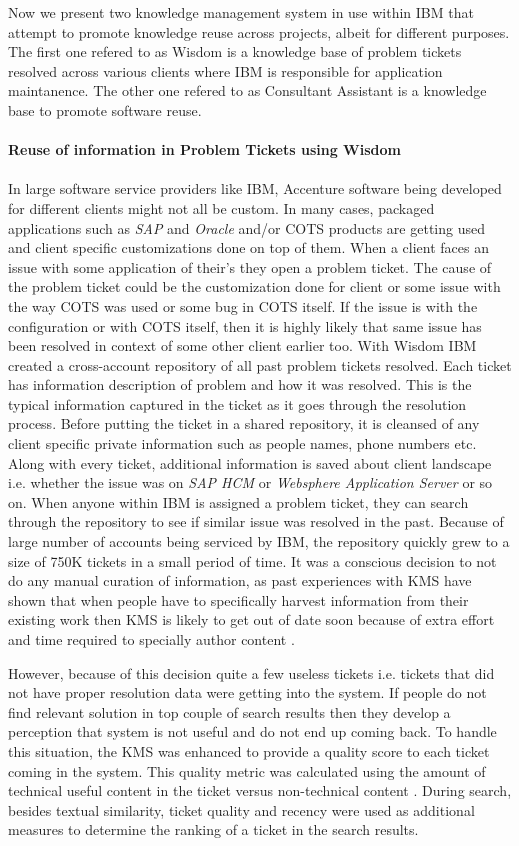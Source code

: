 Now we present two knowledge management system in use within IBM that attempt to promote knowledge reuse across projects, albeit for different purposes. The first one refered to as Wisdom\cite{} is a knowledge base of problem tickets resolved across various clients where IBM is responsible for application maintanence. The other one refered to as Consultant Assistant\cite{} is a knowledge base to promote software reuse. \\
\\
{\bf Reuse of information in Problem Tickets using Wisdom}\\ 
\\
In large software service providers like IBM, Accenture software being developed for different clients might not all be custom. In many cases, packaged applications such as \textit{SAP} and \textit{Oracle} and/or COTS products are getting used and client specific customizations done on top of them. When a client faces an issue with some application of their's they open a problem ticket. The cause of the problem ticket could be the customization done for client or some issue with the way COTS was used or some bug in COTS itself. If the issue is with the configuration or with COTS itself, then it is highly likely that same issue has been resolved in context of some other client earlier too. With Wisdom IBM created a cross-account repository of all past problem tickets resolved. Each ticket has information description of problem and how it was resolved. This is the typical information captured in the ticket as it goes through the resolution process. Before putting the ticket in a shared repository, it is cleansed of any client specific private information such as people names, phone numbers etc. Along with every ticket, additional information is saved about client landscape i.e. whether the issue was on \textit{SAP HCM} or \textit{Websphere Application Server} or so on. When anyone within IBM is assigned a problem ticket, they can search through the repository to see if similar issue was resolved in the past. Because of large number of accounts being serviced by IBM, the repository quickly grew to a size of 750K tickets in a small period of time. It was a conscious decision to not do any manual curation of information, as past experiences with KMS have shown that when people have to specifically harvest information from their existing work then KMS is likely to get out of date soon because of extra effort and time required to specially author content \cite{}.

However, because of this decision quite a few useless tickets i.e. tickets that did not have proper resolution data were getting into the system. If people do not find relevant solution in top couple of search results then they develop a perception that system is not useful and do not end up coming back. To handle this situation, the KMS was enhanced to provide a quality score to each ticket coming in the system. This quality metric was calculated using the amount of technical useful content in the ticket versus non-technical content \cite{}. During search, besides textual similarity, ticket quality and recency were used as additional measures to determine the ranking of a ticket in the search results. 

